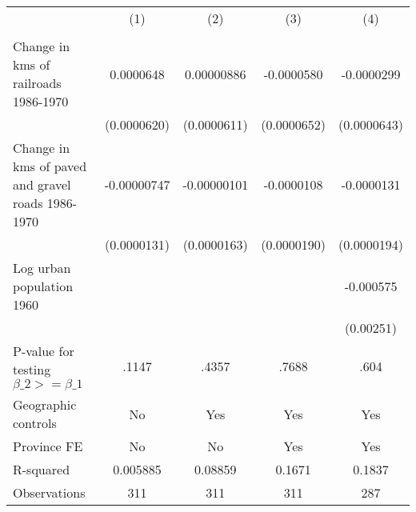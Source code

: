 {
\def\sym#1{\ifmmode^{#1}\else\(^{#1}\)\fi}
\begin{tabular}{l*{4}{c}}
\hline\hline
                &\multicolumn{1}{c}{(1)}&\multicolumn{1}{c}{(2)}&\multicolumn{1}{c}{(3)}&\multicolumn{1}{c}{(4)}\\
                &\multicolumn{1}{c}{}&\multicolumn{1}{c}{}&\multicolumn{1}{c}{}&\multicolumn{1}{c}{}\\
\hline
Change in kms of railroads 1986-1970&0.0000648         &0.00000886         &-0.0000580         &-0.0000299         \\
                &(0.0000620)         &(0.0000611)         &(0.0000652)         &(0.0000643)         \\
[1em]
Change in kms of paved and gravel roads 1986-1970&-0.00000747         &-0.00000101         &-0.0000108         &-0.0000131         \\
                &(0.0000131)         &(0.0000163)         &(0.0000190)         &(0.0000194)         \\
[1em]
Log urban population 1960&                  &                  &                  &-0.000575         \\
                &                  &                  &                  &(0.00251)         \\
\hline
P-value for testing $\beta\_{2} >= \beta\_{1}$&    .1147         &    .4357         &    .7688         &     .604         \\
Geographic controls&       No         &      Yes         &      Yes         &      Yes         \\
Province FE     &       No         &       No         &      Yes         &      Yes         \\
R-squared       & 0.005885         &  0.08859         &   0.1671         &   0.1837         \\
Observations    &      311         &      311         &      311         &      287         \\
\hline\hline
\end{tabular}
}

